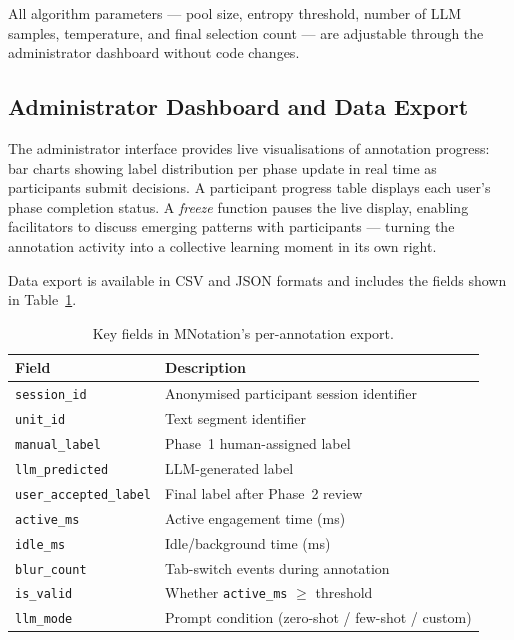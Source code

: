 \documentclass[fleqn,10pt]{JLA_article}
\begin{document}
All algorithm parameters — pool size, entropy threshold, number of LLM samples,
temperature, and final selection count — are adjustable through the administrator
dashboard without code changes.

\subsection{Administrator Dashboard and Data Export}

The administrator interface provides live visualisations of annotation progress: bar charts
showing label distribution per phase update in real time as participants submit decisions.
A participant progress table displays each user's phase completion status. A \emph{freeze}
function pauses the live display, enabling facilitators to discuss emerging patterns with
participants — turning the annotation activity into a collective learning moment in its
own right.

Data export is available in CSV and JSON formats and includes the fields shown in Table~\ref{tab:schema}.

\begin{table}[hbt]
\caption{Key fields in MNotation's per-annotation export.}
\label{tab:schema}
\centering
\small
\begin{tabular}{lp{5.5cm}}
\toprule
\textbf{Field} & \textbf{Description} \\
\midrule
\texttt{session\_id}           & Anonymised participant session identifier \\
\texttt{unit\_id}              & Text segment identifier \\
\texttt{manual\_label}         & Phase~1 human-assigned label \\
\texttt{llm\_predicted}        & LLM-generated label \\
\texttt{user\_accepted\_label} & Final label after Phase~2 review \\
\texttt{active\_ms}            & Active engagement time (ms) \\
\texttt{idle\_ms}              & Idle/background time (ms) \\
\texttt{blur\_count}           & Tab-switch events during annotation \\
\texttt{is\_valid}             & Whether \texttt{active\_ms} $\ge$ threshold \\
\texttt{llm\_mode}             & Prompt condition (zero-shot / few-shot / custom) \\
\bottomrule
\end{tabular}
\end{table}
\end{document}
